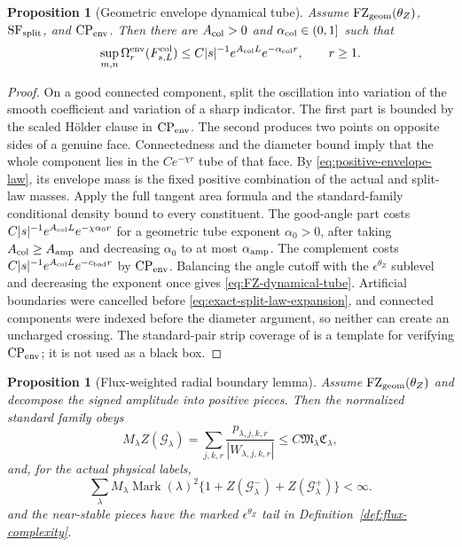 \documentclass[11pt]{article}
\newtheorem{proposition}[theorem]{Proposition}
\begin{document}
\begin{proposition}[Geometric envelope dynamical tube]
\label{prop:envelope-dynamical-tube}
Assume $\mathrm{FZ}_{\rm geom}(\theta_Z)$,
$\mathrm{SF}_{\rm split}$, and $\mathrm{CP}_{\rm env}$.  Then there are
$A_{\rm col}>0$ and $\alpha_{\rm col}\in(0,1]$ such that
\begin{equation}
\label{eq:FZ-dynamical-tube}
 \sup_{m,n}\Omega_r^{\rm env}(F_{s,L}^{\rm col})
 \le C|s|^{-1}e^{A_{\rm col}L}e^{-\alpha_{\rm col}r},
 \qquad r\ge1.
\end{equation}
\end{proposition}

\begin{proof}
On a good connected component, split the oscillation into variation of the
smooth coefficient and variation of a sharp indicator.  The first part is
bounded by the scaled H\"older clause in $\mathrm{CP}_{\rm env}$.  The second
produces two points on opposite sides of a genuine face.  Connectedness and
the diameter bound imply that the whole component lies in the
$Ce^{-\chi r}$ tube of that face.  By
\eqref{eq:positive-envelope-law}, its envelope mass is the fixed positive
combination of the actual and split-law masses.  Apply the full tangent area
formula and the standard-family conditional density bound to every
constituent.  The good-angle part costs
$C|s|^{-1}e^{A_{\rm col}L}e^{-\chi\alpha_0r}$ for a geometric tube exponent
$\alpha_0>0$, after taking
$A_{\rm col}\ge A_{\rm amp}$ and decreasing $\alpha_0$ to at most
$\alpha_{\rm amp}$.  The complement costs
$C|s|^{-1}e^{A_{\rm col}L}e^{-c_{\rm bad}r}$ by
$\mathrm{CP}_{\rm env}$.  Balancing the angle cutoff with the
$\epsilon^{\theta_Z}$ sublevel and decreasing the exponent once gives
\eqref{eq:FZ-dynamical-tube}.  Artificial boundaries were cancelled before
\eqref{eq:exact-split-law-expansion}, and connected components were indexed
before the diameter argument, so neither can create an uncharged crossing.
The standard-pair strip coverage of \cite{CanestrariPerturb} is a template
for verifying $\mathrm{CP}_{\rm env}$; it is not used as a black box.
\end{proof}

\begin{proposition}[Flux-weighted radial boundary lemma]
\label{prop:radial-direct-Z}
Assume $\mathrm{FZ}_{\rm geom}(\theta_Z)$ and decompose the signed amplitude into
positive pieces.  Then the normalized standard family obeys
\begin{equation}
\label{eq:radial-direct-Z-bound}
 M_\lambda Z(\mathcal G_\lambda)
 =\sum_{j,k,r}\frac{p_{\lambda,j,k,r}}
 {|W_{\lambda,j,k,r}|}
 \le C\mathfrak M_\lambda\mathfrak C_\lambda,
\end{equation}
and, for the actual physical labels,
\begin{equation}
\label{eq:joint-mark-Z-ledger}
 \sum_\lambda M_\lambda
 \operatorname{Mark}(\lambda)^2
 \{1+Z(\mathcal G_\lambda^-)+Z(\mathcal G_\lambda^+)\}<\infty.
\end{equation}
and the near-stable pieces have the marked
$\epsilon^{\theta_Z}$ tail in Definition~\ref{def:flux-complexity}.
\end{proposition}
\end{document}
